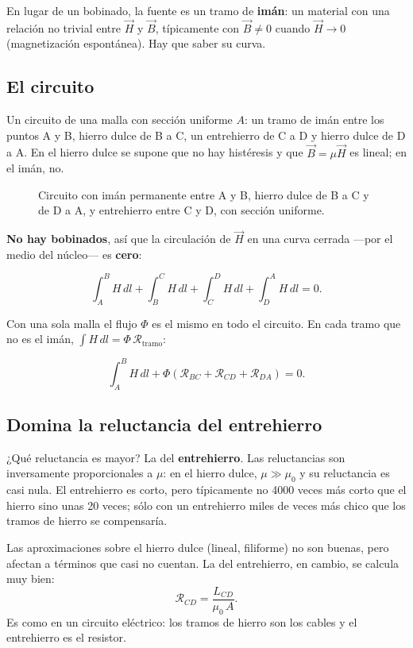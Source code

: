 \documentclass[12pt,a4paper]{article}
\begin{document}
En lugar de un bobinado, la fuente es un tramo de \textbf{imán}: un material con una
relación no trivial entre $\vec H$ y $\vec B$, típicamente con $\vec B\neq0$
cuando $\vec H\to0$ (magnetización espontánea). Hay que saber su curva.

\subsection{El circuito}

Un circuito de una malla con sección uniforme $A$: un tramo de imán entre los
puntos A y B, hierro dulce de B a C, un entrehierro de C a D y hierro dulce de
D a A. En el hierro dulce se supone que no hay histéresis y que
$\vec B = \mu\vec H$ es lineal; en el imán, no.

\begin{figure}[H]
  \centering
  
  \caption{Circuito con imán permanente entre A y B, hierro dulce de B a C y de D a A, y entrehierro entre C y D, con sección uniforme.}
\end{figure}

\textbf{No hay bobinados}, así que la circulación de $\vec H$ en una curva cerrada
---por el medio del núcleo--- es \textbf{cero}:

\[
\int_A^B H\,dl + \int_B^C H\,dl + \int_C^D H\,dl + \int_D^A H\,dl = 0 .
\]

Con una sola malla el flujo $\Phi$ es el mismo en todo el circuito. En cada
tramo que no es el imán, $\int H\,dl = \Phi\,\mathcal{R}_{\text{tramo}}$:

\[
\int_A^B H\,dl + \Phi\left(\mathcal{R}_{BC} + \mathcal{R}_{CD} + \mathcal{R}_{DA}\right) = 0 .
\]

\subsection{Domina la reluctancia del entrehierro}

¿Qué reluctancia es mayor? La del \textbf{entrehierro}. Las reluctancias son
inversamente proporcionales a $\mu$: en el hierro dulce, $\mu\gg\mu_0$ y su
reluctancia es casi nula. El entrehierro es corto, pero típicamente no 4000
veces más corto que el hierro sino unas 20 veces; sólo con un entrehierro
miles de veces más chico que los tramos de hierro se compensaría.

\begin{notebox}
Las aproximaciones sobre el hierro dulce
(lineal, filiforme) no son buenas, pero afectan a términos que casi no
cuentan. La del entrehierro, en cambio, se calcula muy bien:
\[
\mathcal{R}_{CD} = \frac{L_{CD}}{\mu_0\,A} .
\]
Es como en un circuito eléctrico: los tramos de hierro son los cables y el
entrehierro es el resistor.
\end{notebox}
\end{document}
